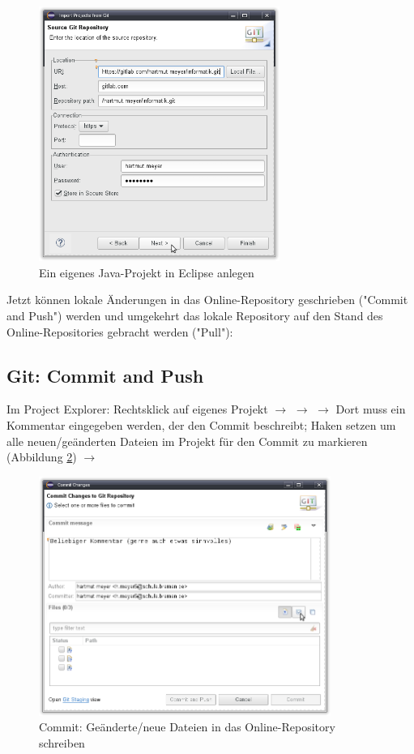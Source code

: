 \begin{figure}[h]
  \centering
   \includegraphics[width=0.70\textwidth]{./inf/SEKII/01_Vorbereitung/Import_Project_from_Git.png}
   \caption{Ein eigenes Java-Projekt in Eclipse anlegen}
   \label{fig:import-project-from-git}
\end{figure}


Jetzt können lokale Änderungen in das Online-Repository geschrieben ("Commit
and Push") werden und umgekehrt das lokale Repository auf den Stand des
Online-Repositories gebracht werden ("Pull"):

\subsection{Git: Commit and Push}

Im Project Explorer: Rechtsklick auf eigenes Projekt $\rightarrow$ 
$\rightarrow$  $\rightarrow$ Dort muss ein Kommentar
eingegeben werden, der den Commit beschreibt; Haken setzen um alle
neuen/geänderten Dateien im Projekt für den Commit zu markieren (Abbildung
\ref{fig:git-commit}) $\rightarrow$ 

\begin{figure}[h]
  \centering
   \includegraphics[width=0.85\textwidth]{./inf/SEKII/01_Vorbereitung/Git-Commit.png}
   \caption{Commit: Geänderte/neue Dateien in das Online-Repository schreiben}
   \label{fig:git-commit}
\end{figure}

